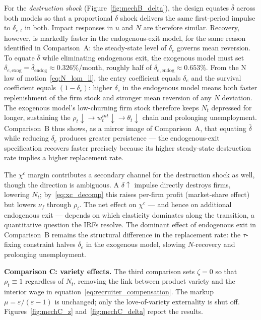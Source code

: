 \documentclass[authoryear, review, 12pt]{elsarticle}
\begin{document}
	For the \emph{destruction shock} (Figure~\ref{fig:mechB_delta}),
	the design equates $\bar\delta$ across both models so that a
	proportional $\delta$ shock delivers the same first-period
	impulse to $\delta_{e,t}$ in both.
	Impact responses in $u$ and $N$ are therefore similar.
	Recovery, however, is markedly faster in the endogenous-exit model,
	for the same reason identified in Comparison~A: the steady-state
	level of $\delta_e$ governs mean reversion.
	To equate $\bar\delta$ while eliminating endogenous exit, the
	exogenous model must set
	$\delta_{e,\mathrm{exog}}=\bar\delta_\mathrm{endog}\approx0.326\%$/month,
	roughly half of $\delta_{e,\mathrm{endog}}\approx0.653\%$.
	From the N law of motion~\eqref{eq:N_lom_ll}, the entry coefficient equals
	$\delta_e$ and the survival coefficient equals $(1-\delta_e)$:
	higher $\delta_e$ in the endogenous model means both faster
	replenishment of the firm stock and stronger mean reversion of
	any $N$ deviation.
	The exogenous model's low-churning firm stock therefore keeps
	$N_t$ depressed for longer, sustaining the $\rho_t\downarrow
	\to w_t^{int}\downarrow\to\theta_t\downarrow$ chain and
	prolonging unemployment.
	Comparison~B thus shows, as a mirror image of Comparison~A,
	that equating $\bar\delta$ while reducing $\delta_e$ produces
	greater persistence --- the endogenous-exit specification
	recovers faster precisely because its higher steady-state
	destruction rate implies a higher replacement rate.

	The $\chi^c$ margin contributes a secondary channel for the destruction
	shock as well, though the direction is ambiguous.
	A $\delta\uparrow$ impulse directly destroys firms, lowering $N_t$;
	by~\eqref{eq:xc_decomp} this raises per-firm profit (market-share
	effect) but lowers $\nu_f$ through $\rho_t$.
	The net effect on $\chi^c$ --- and hence on additional endogenous exit ---
	depends on which elasticity dominates along the transition, a
	quantitative question the IRFs resolve.
	The dominant effect of endogenous exit in Comparison~B remains
	the structural difference in the replacement rate: the $\tau$-fixing
	constraint halves $\delta_e$ in the exogenous model, slowing
	$N$-recovery and prolonging unemployment.

	\medskip\noindent\textbf{Comparison C: variety effects.}
	The third comparison sets $\zeta=0$ so that $\rho_t\equiv1$
	regardless of $N_t$, removing the link between product variety
	and the interior wage in equation~\eqref{eq:recruiter_compensation}.
	The markup $\mu=\varepsilon/(\varepsilon-1)$ is unchanged; only
	the love-of-variety externality is shut off.
	Figures~\ref{fig:mechC_z} and~\ref{fig:mechC_delta} report the results.
\end{document}
